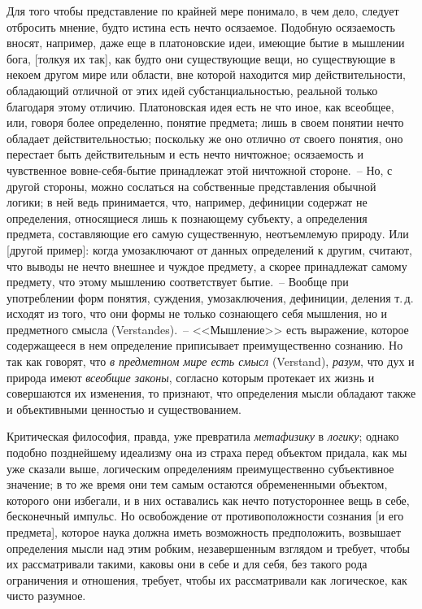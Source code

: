 Для того чтобы представление по крайней мере понимало,
в чем дело, следует отбросить мнение, будто истина
есть нечто осязаемое. Подобную осязаемость вносят, например,
даже еще в платоновские идеи, имеющие бытие
в мышлении бога, [толкуя их так], как будто они существующие
вещи, но существующие в некоем другом мире
или области, вне которой находится мир действительности,
обладающий отличной от этих идей субстанциальностью,
реальной только благодаря этому отличию.
Платоновская идея есть не что иное, как всеобщее, или,
говоря более определенно, понятие предмета; лишь
в своем понятии нечто обладает действительностью; поскольку
же оно отлично от своего понятия, оно перестает
быть действительным и есть нечто ничтожное; осязаемость
и чувственное вовне-себя-бытие принадлежат этой
ничтожной стороне.~-- Но, с другой стороны, можно сослаться
на собственные представления обычной логики;
в ней ведь принимается, что, например, дефиниции содержат
не определения, относящиеся лишь к познающему
субъекту, а определения предмета, составляющие его
самую существенную, неотъемлемую природу. Или [другой
пример]: когда умозаключают от данных определений
к другим, считают, что выводы не нечто внешнее и чуждое
предмету, а скорее принадлежат самому предмету,
что этому мышлению соответствует бытие.~-- Вообще при
употреблении форм понятия, суждения, умозаключения,
дефиниции, деления т.\,д. исходят из того, что они формы
не только сознающего себя мышления, но и предметного
смысла (Verstandes).~-- <<Мышление>> есть выражение, которое
содержащееся в нем определение приписывает
преимущественно сознанию. Но так как говорят, что
\emph{в предметном мире есть смысл} (Verstand), \emph{разум}, что
дух и природа имеют \emph{всеобщие законы}, согласно которым
протекает их жизнь и совершаются их изменения, то
признают, что определения мысли обладают также
и объективными ценностью и существованием.

Критическая философия, правда, уже превратила
\emph{метафизику} в \emph{логику}; однако подобно позднейшему
идеализму
она из страха перед объектом придала, как мы
уже сказали выше, логическим определениям преимущественно
субъективное значение; в то же время они
тем самым остаются обремененными объектом, которого
они избегали, и в них оставались как нечто потустороннее
вещь в себе,
бесконечный импульс. Но освобождение
от противоположности сознания [и его предмета],
которое наука должна иметь возможность предположить,
возвышает определения мысли над этим робким, незавершенным
взглядом и требует, чтобы их рассматривали
такими, каковы они в себе и для себя, без такого рода
ограничения и отношения, требует, чтобы их рассматривали
как логическое, как чисто разумное.

